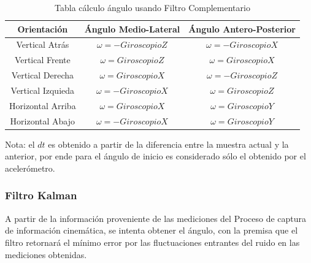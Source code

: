 \documentclass[12pt,a4paper]{article}
\begin{document}
\begin{table}[H]
	\centering
	\begin{tabular}{|c|c|c|}
		\hline 
		\textbf{Orientación} & \textbf{Ángulo Medio-Lateral} & \textbf{Ángulo Antero-Posterior} \\ 
		\hline 
		Vertical Atrás & $\omega= -GiroscopioZ$ &  $\omega= -GiroscopioX$ \\ 
		\hline 
		Vertical Frente & $\omega= GiroscopioZ$ &  $\omega= GiroscopioX$ \\
		\hline 
		Vertical Derecha & $\omega= GiroscopioX$ &  $\omega= -GiroscopioZ$ \\ 
		\hline 
		Vertical Izquieda & $\omega= -GiroscopioX$ &  $\omega= GiroscopioZ$ \\ 
		\hline 
		Horizontal Arriba & $\omega= GiroscopioX$ &  $\omega= GiroscopioY$ \\ 
		\hline 
		Horizontal Abajo & $\omega= -GiroscopioX$ &  $\omega= GiroscopioY$ \\ 
		\hline 
	\end{tabular}
	\caption{Tabla cálculo ángulo usando Filtro Complementario} 
	\label{table:calculoAnguloFiltroComplementario}
\end{table}

Nota: el $dt$ es obtenido a partir de la diferencia entre la muestra actual y la anterior, por ende para el ángulo de inicio es considerado sólo el obtenido por el acelerómetro.

\subsubsection{Filtro Kalman}
A partir de la información proveniente de las mediciones del Proceso de captura de información cinemática, se intenta obtener el ángulo, con la premisa que el filtro retornará el mínimo error por las fluctuaciones entrantes del ruido en las mediciones obtenidas.
\end{document}
